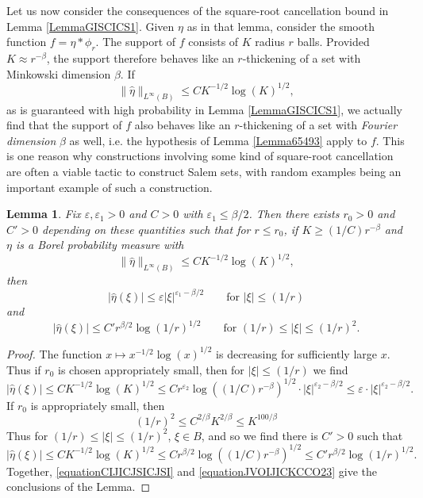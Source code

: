 \documentclass[12pt,reqno]{article}
\numberwithin{equation}{section}
\newtheorem{lemma}[theorem]{Lemma}
\numberwithin{theorem}{section}
\begin{document}
Let us now consider the consequences of the square-root cancellation bound in Lemma \ref{LemmaGISCICS1}. Given $\eta$ as in that lemma, consider the smooth function $f = \eta * \phi_r$. The support of $f$ consists of $K$ radius $r$ balls. Provided $K \approx r^{-\beta}$, the support therefore behaves like an $r$-thickening of a set with Minkowski dimension $\beta$. If
%
\begin{equation}
    \| \widehat{\eta} \|_{L^\infty(B)} \leq C K^{-1/2} \log(K)^{1/2},
\end{equation}
%
as is guaranteed with high probability in Lemma \ref{LemmaGISCICS1}, we actually find that the support of $f$ also behaves like an $r$-thickening of a set with \emph{Fourier dimension} $\beta$ as well, i.e. the hypothesis of Lemma \ref{Lemma65493} apply to $f$. This is one reason why constructions involving some kind of square-root cancellation are often a viable tactic to construct Salem sets, with random examples being an important example of such a construction.

\begin{lemma} \label{remarkGGIVJIS}
    Fix $\varepsilon,\varepsilon_1 > 0$ and $C > 0$ with $\varepsilon_1 \leq \beta/2$. Then there exists $r_0 > 0$ and $C' > 0$ depending on these quantities such that for $r \leq r_0$, if $K \geq (1/C) r^{-\beta}$ and $\eta$ is a Borel probability measure with
    \[ \| \widehat{\eta} \|_{L^\infty(B)} \leq C K^{-1/2} \log(K)^{1/2}, \]
    then
    \[ |\widehat{\eta}(\xi)| \leq \varepsilon |\xi|^{\varepsilon_1 - \beta/2} \quad\quad \text{for $|\xi| \leq (1/r)$} \]
    and
    \[ |\widehat{\eta}(\xi)| \leq C' r^{\beta/2} \log(1/r)^{1/2} \quad\quad \text{for $(1/r) \leq |\xi| \leq (1/r)^{2}$}. \]
\end{lemma}
\begin{proof}
    The function $x \mapsto x^{-1/2} \log(x)^{1/2}$ is decreasing for sufficiently large $x$. Thus if $r_0$ is chosen appropriately small, then for $|\xi| \leq (1/r)$ we find
    \begin{equation} \label{equationCIJICJSICJSI}
        |\widehat{\eta}(\xi)| \leq C K^{-1/2} \log(K)^{1/2} \leq C r^{\varepsilon_2} \log((1/C) r^{-\beta})^{1/2} \cdot |\xi|^{\varepsilon_2 - \beta/2} \leq \varepsilon \cdot |\xi|^{\varepsilon_2 - \beta/2}.
    \end{equation}
    If $r_0$ is appropriately small, then
    \[ (1/r)^2 \leq C^{2/\beta} K^{2/\beta} \leq K^{100/\beta} \]
    Thus for $(1/r) \leq |\xi| \leq (1/r)^2$, $\xi \in B$, and so we find there is $C' > 0$ such that
    \begin{equation} \label{equationJVOIJICKCCO23}
        |\widehat{\eta}(\xi)| \leq C K^{-1/2} \log(K)^{1/2} \leq C r^{\beta/2} \log((1/C) r^{-\beta})^{1/2} \leq C' r^{\beta/2} \log(1/r)^{1/2}.
    \end{equation}
    Together, \eqref{equationCIJICJSICJSI} and \eqref{equationJVOIJICKCCO23} give the conclusions of the Lemma.
\end{proof}
\end{document}
